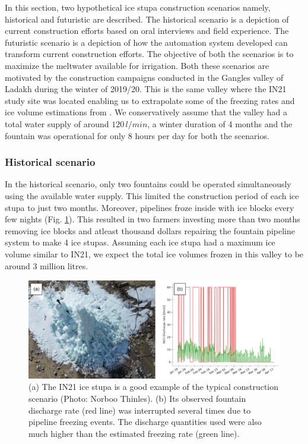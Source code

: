 \documentclass[tc, manuscript]{copernicus}
\begin{document}
In this section, two hypothetical ice stupa construction scenarios namely, historical and futuristic are
described. The historical scenario is a depiction of current construction efforts based on oral interviews and
field experience. The futuristic scenario is a depiction of how the automation system developed can transform
current construction efforts. The objective of both the scenarios is to maximize the meltwater available for
irrigation. Both these scenarios are motivated by the construction campaigns conducted in the Gangles valley of
Ladakh during the winter of 2019/20. This is the same valley where the IN21 study site was located enabling us
to extrapolate some of the freezing rates and ice volume estimations from
\citet{balasubramanianInfluenceMeteorologicalConditions2022}. We conservatively assume that the valley had a
total water supply of around $120\,l/min$, a winter duration of 4 months and the fountain was operational for
only 8 hours per day for both the scenarios. 

\subsubsection{Historical scenario}

In the historical scenario, only two fountains could be operated simultaneously using the available water
supply. This limited the construction period of each ice stupa to just two months. Moreover, pipelines froze
inside with ice blocks every few nights (Fig. \ref{fig:gangles_data}). This resulted in two farmers investing more than two months removing
ice blocks and atleast thousand dollars repairing the fountain pipeline system to make 4 ice stupas. Assuming
each ice stupa had a maximum ice volume similar to IN21, we expect the total ice volumes frozen in this valley
to be around 3 million litres.   

\begin{figure}[htb]
	\includegraphics[width=\textwidth]{Figures/gangles_data}

  \caption{(a) The IN21 ice stupa is a good example of the typical construction scenario (Photo: Norboo
  Thinles). (b) Its observed fountain discharge rate (red line) was interrupted several times due to pipeline
freezing events. The discharge quantities used were also much higher than the estimated freezing rate (green
line). }

	\label{fig:gangles_data}
\end{figure}
\end{document}
